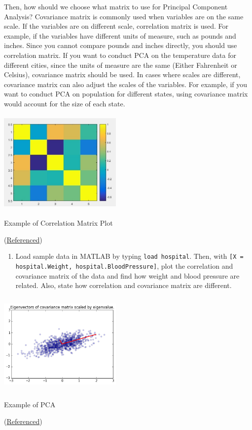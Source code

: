 \documentclass{tufte-handout}
\begin{document}
Then, how should we choose what matrix to use for Principal Component Analysis? Covariance matrix is commonly used when variables are on the same scale. If the variables are on different scale, correlation matrix is used. For example, if the variables have different units of measure, such as pounds and inches. Since you cannot compare pounds and inches directly, you should use correlation matrix. If you want to conduct PCA on the temperature data for different cities, since the units of measure are the same (Either Fahrenheit or Celsius), covariance matrix should be used. In cases where scales are different, covariance matrix can also adjust the scales of the variables. For example, if you want to conduct PCA on population for different states, using covariance matrix would account for the size of each state.

\begin{marginfigure}
    \centering
    \includegraphics[width = 6cm, height = 5cm]{correlation.jpg}
    \label{fig:corr}
\caption{Example of Correlation Matrix Plot}
(\href{https://www.quora.com/Whats-the-best-way-to-visualize-correlations-between-six-value-vectors}{Referenced})


\end{marginfigure}

\begin{enumerate}
	\item Load sample data in MATLAB by typing \verb|load hospital|. Then, with \verb|[X = hospital.Weight, hospital.BloodPressure]|, plot the correlation and covariance matrix of the data and find how weight and blood pressure are related. Also, state how correlation and covariance matrix are different.
\end{enumerate}

\begin{marginfigure}
    \centering
    \includegraphics[width = 6cm, height = 5cm]{PCA.png}
    \label{fig:PCA}
\caption{Example of PCA}
(\href{https://people.duke.edu/~ccc14/sta-663/PCASolutions.html}{Referenced})

\end{marginfigure}
\end{document}
